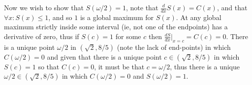 \documentclass{article}
\begin{document}
Now we wish to show that $S(\omega/2)=1$, note that $\frac{d}{dx}S(x) = C(x)$, and that $\forall x: S(x)\leq1$, and so $1$ is a global maximum for $S(x)$. At any global maximum strictly inside some interval (ie, not one of the endpoints) has a derivative of zero, thus if $S(c)=1$ for some $c$ then $\frac{dS}{dx}|_{x=c} = C(c) = 0$. There is a unique point $\omega/2$ in $(\sqrt{2},8/5)$ (note the lack of end-points) in which $C(\omega/2)=0$ and given that there is a unique point $c\in(\sqrt{2},8/5)$ in which $S(c)=1$ so that $C(c)=0$, it must be that $c=\omega/2$, thus there is a unique $\omega/2\in(\sqrt{2},8/5)$ in which $C(\omega/2)=0$ and $S(\omega/2)=1$.
\end{document}
